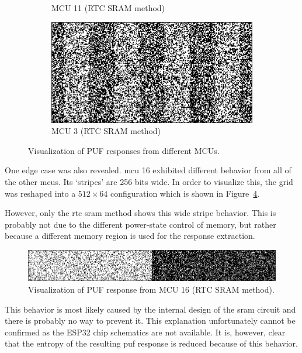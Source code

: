 \begin{figure}[ht!]
\begin{subfigure}[b]{0.475\textwidth}
            \caption{MCU 11 (RTC SRAM method)}    
            \label{fig:mcu_11}
        \end{subfigure}
        \hfill
        \begin{subfigure}[b]{0.475\textwidth}   
            \centering 
            \includegraphics[width=\textwidth]{images/3_response_rtc.png}
            \caption{MCU 3 (RTC SRAM method)}    
            \label{fig:mcu_3}
        \end{subfigure}
        \caption{Visualization of PUF responses from different MCUs.} 
        \label{fig:puf_response_visualization}
\end{figure}

One edge case was also revealed. \Gls{mcu} 16 exhibited different behavior from all of the other \glspl{mcu}. Its `stripes' are 256 bits wide. In order to visualize this, the grid was reshaped into a $512 \times 64$ configuration which is shown in Figure~\ref{fig:16_response_sleep}.

However, only the \gls{rtc} \gls{sram} method shows this wide stripe behavior. This is probably not due to the different power-state control of memory, but rather because a different memory region is used for the response extraction.

\begin{figure}[ht!]
    \centering
    \captionsetup{justification=centering,margin=0.5cm}
    \includegraphics[width=\textwidth]{images/16_response_sleep.png}
    \caption{Visualization of PUF response from MCU 16 (RTC SRAM method).}
    \label{fig:16_response_sleep}
\end{figure}

This behavior is most likely caused by the internal design of the \gls{sram} circuit and there is probably no way to prevent it. This explanation unfortunately cannot be confirmed as the ESP32 chip schematics are not available. It is, however, clear that the entropy of the resulting \gls{puf} response is reduced because of this behavior.

